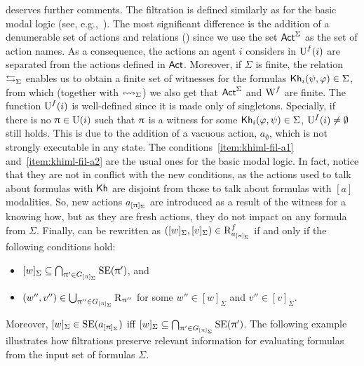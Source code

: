  deserves further comments.
The filtration is defined similarly as for the basic modal logic (see, e.g.,~\cite{mlbook}).
The most significant difference is the addition of a denumerable set of actions and relations () since we use the set ${\rm \sf Act}^\Sigma$ as the set of action names.
As a consequence, the actions an agent $i$ considers in $\operatorname{U}^f(i)$ are separated from the actions defined in ${\rm \sf Act}$.
Moreover, if $\Sigma$ is finite, the relation $\mathrel{\leftrightarrows}_\Sigma$ enables us to obtain a finite set of witnesses for the formulas ${\sf Kh}_i(\psi,\varphi) \in \Sigma$, from which (together with $\leftrightsquigarrow_\Sigma$) we also get that ${\rm \sf Act}^\Sigma$ and $\operatorname{W}^f$ are finite.
The function $\operatorname{U}^f(i)$ is well-defined since it is made only of singletons. Specially, if there is no $\uppi \in \operatorname{U}(i)$ such that $\uppi$ is a witness for some ${\sf Kh}_i(\varphi,\psi) \in \Sigma$, $\operatorname{U}^f(i)\neq \emptyset$ still holds.
This is due to the addition of a vacuous action, $a_\emptyset$, which is not strongly executable in any state.
The conditions~\ref{item:khiml-fil-a1} and~\ref{item:khiml-fil-a2} are the usual ones for the basic modal logic.
In fact, notice that they are not in conflict with the new conditions, as the actions used to talk about formulas with ${\sf Kh}$ are disjoint from those to talk about formulas with $[a]$ modalities.
So, new actions $a_{[\uppi]_\Sigma}$ are introduced as a result of the witness for a knowing how, but as they are fresh actions, they do not impact on any formula from $\Sigma$.
Finally,  can be rewritten as $([w]_\Sigma,[v]_\Sigma) \in \operatorname{R}^f_{a_{[\uppi]_\Sigma}}$ if and only if the following conditions hold:

\begin{itemize}
\item $[w]_\Sigma \subseteq \bigcap_{\uppi' \in G_{[\uppi]_\Sigma}} \operatorname{SE}(\uppi')$, and
\item $(w'',v'') \in \bigcup_{\uppi'' \in G_{[\uppi]_\Sigma}} \operatorname{R}_{\uppi''}$ for some $w'' \in [w]_\Sigma$ and $v'' \in [v]_\Sigma$.
\end{itemize}

Moreover, $[w]_\Sigma \in \operatorname{SE}(a_{[\uppi]_\Sigma})$ iff $[w]_\Sigma \subseteq \bigcap_{\uppi' \in G_{[\uppi]_\Sigma}} \operatorname{SE}(\uppi')$.
The following example illustrates how filtrations preserve relevant information for evaluating formulas from the input set of formulas $\Sigma$.

\medskip

